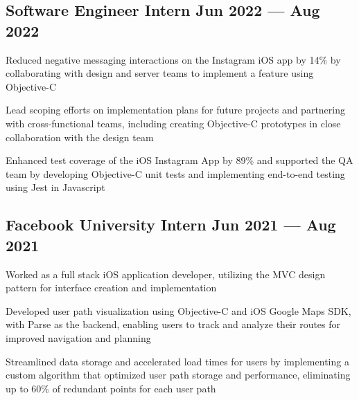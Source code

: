 
\subsection{{Software Engineer Intern \hfill Jun 2022 --- Aug 2022}}
\begin{zitemize}
\item Reduced negative messaging interactions on the Instagram iOS app by 14\% by collaborating with design and server teams to implement a feature using Objective-C
\item Lead scoping efforts on implementation plans for future projects and partnering with cross-functional teams, including creating Objective-C prototypes in close collaboration with the design team
\item Enhanced test coverage of the iOS Instagram App by 89\% and supported the QA team by developing Objective-C unit tests and implementing end-to-end testing using Jest in Javascript
\end{zitemize}

% 
\subsection{{Facebook University Intern \hfill Jun 2021 --- Aug 2021}}
\begin{zitemize}
\item Worked as a full stack iOS application developer, utilizing the MVC design pattern for interface creation and implementation
\item Developed user path visualization using Objective-C and iOS Google Maps SDK, with Parse as the backend, enabling users to track and analyze their routes for improved navigation and planning
\item Streamlined data storage and accelerated load times for users by implementing a custom algorithm that optimized user path storage and performance, eliminating up to 60\% of redundant points for each user path
\end{zitemize}

